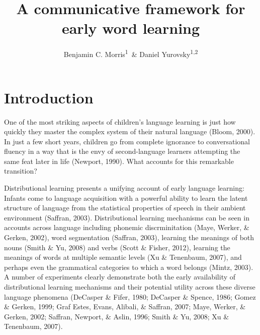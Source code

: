 \documentclass[english,,man,floatsintext]{apa6}
\author{Benjamin C. Morris\textsuperscript{1}\ \& Daniel Yurovsky\textsuperscript{1,2}}
\affiliation{
\vspace{0.5cm}
\textsuperscript{1} University of Chicago\\\textsuperscript{2} Carnegie Mellon University}
\title{A communicative framework for early word learning}
\date{}
\begin{document}
\maketitle

\hypertarget{introduction}{%
\section{Introduction}\label{introduction}}

One of the most striking aspects of children's language learning is just how quickly they master the complex system of their natural language (Bloom, 2000). In just a few short years, children go from complete ignorance to conversational fluency in a way that is the envy of second-language learners attempting the same feat later in life (Newport, 1990). What accounts for this remarkable transition?

Distributional learning presents a unifying account of early language learning: Infants come to language acquisition with a powerful ability to learn the latent structure of language from the statistical properties of speech in their ambient environment (Saffran, 2003). Distributional learning mechanisms can be seen in accounts across language including phonemic discrminitation (Maye, Werker, \& Gerken, 2002), word segmentation (Saffran, 2003), learning the meanings of both nouns (Smith \& Yu, 2008) and verbs (Scott \& Fisher, 2012), learning the meanings of words at multiple semantic levels (Xu \& Tenenbaum, 2007), and perhaps even the grammatical categories to which a word belongs (Mintz, 2003). A number of experiments clearly demonstrate both the early availability of distributional learning mechanisms and their potential utility across these diverse language phenomena (DeCasper \& Fifer, 1980; DeCasper \& Spence, 1986; Gomez \& Gerken, 1999; Graf Estes, Evans, Alibali, \& Saffran, 2007; Maye, Werker, \& Gerken, 2002; Saffran, Newport, \& Aslin, 1996; Smith \& Yu, 2008; Xu \& Tenenbaum, 2007).
\end{document}
